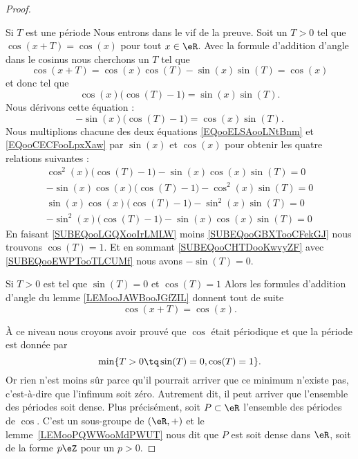 \begin{proof}
\begin{subproof}
		\item[Si \( T\) est une période]
		Nous entrons dans le vif de la preuve. Soit un \( T>0\) tel que \( \cos(x+T)=\cos(x)\) pour tout \( x\in \eR\). Avec la formule d'addition d'angle dans le cosinus nous cherchons un \( T\) tel que
		\begin{equation}
			\cos(x+T)=\cos(x)\cos(T)-\sin(x)\sin(T)=\cos(x)
		\end{equation}
		et donc tel que
		\begin{equation}        \label{EQooELSAooLNtBnm}
			\cos(x)\big( \cos(T)-1 \big)=\sin(x)\sin(T).
		\end{equation}
		Nous dérivons cette équation :
		\begin{equation}        \label{EQooCECFooLpxXaw}
			-\sin(x)\big( \cos(T)-1 \big)=\cos(x)\sin(T).
		\end{equation}
		Nous multiplions chacune des deux équations \eqref{EQooELSAooLNtBnm} et \eqref{EQooCECFooLpxXaw} par \( \sin(x)\) et \( \cos(x)\) pour obtenir les quatre relations suivantes :
		\begin{subequations}
			\begin{align}
				\cos^2(x)\big( \cos(T)-1 \big)-\sin(x)\cos(x)\sin(T)=0      \label{SUBEQooLGQXooIrLMLW}       \\
				-\sin(x)\cos(x)\big( \cos(T)-1 \big)-\cos^2(x)\sin(T)=0     \label{SUBEQooCHTDooKwvyZF}       \\
				\sin(x)\cos(x)\big( \cos(T)-1 \big)-\sin^2(x)\sin(T)=0      \label{SUBEQooEWPTooTLCUMf}       \\
				-\sin^2(x)\big( \cos(T)-1 \big)-\sin(x)\cos(x)\sin(T)=0     \label{SUBEQooGBXTooCFekGJ}
			\end{align}
		\end{subequations}
		En faisant \eqref{SUBEQooLGQXooIrLMLW} moins \eqref{SUBEQooGBXTooCFekGJ} nous trouvons \( \cos(T)=1\). Et en sommant \eqref{SUBEQooCHTDooKwvyZF} avec \eqref{SUBEQooEWPTooTLCUMf} nous avons \( -\sin(T)=0\).

		\item[Si \( T>0\) est tel que \( \sin(T)=0\) et \( \cos(T)=1\)]
		Alors les formules d'addition d'angle du lemme \ref{LEMooJAWBooJGfZIL} donnent tout de suite
		\begin{equation}
			\cos(x+T)=\cos(x).
		\end{equation}

	\end{subproof}

	À ce niveau nous croyons avoir prouvé que \( \cos\) était périodique et que la période est donnée par
	\begin{equation}
		\min\{ T>0\tq \sin(T)=0,\cos(T)=1 \}.
	\end{equation}
	Or rien n'est moins sûr parce qu'il pourrait arriver que ce minimum n'existe pas, c'est-à-dire que l'infimum soit zéro. Autrement dit, il peut arriver que l'ensemble des périodes soit dense. Plus précisément, soit \( P\subset \eR\) l'ensemble des périodes de \( \cos\). C'est un sous-groupe de \( (\eR,+)\) et le lemme~\ref{LEMooPQWWooMdPWUT} nous dit que \( P\) est soit dense dans \( \eR\), soit de la forme \( p\eZ\) pour un \( p>0\).


\end{proof}

